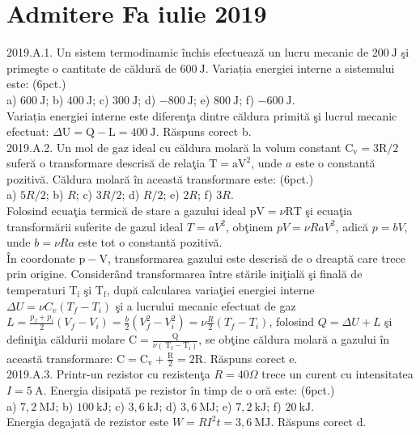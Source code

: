 
\section{Admitere Fa iulie 2019}

2019.A.1. Un sistem termodinamic închis efectuează un lucru mecanic de $200 \mathrm{~J}$ şi primeşte o cantitate de căldură de $600 \mathrm{~J}$. Variația energiei interne a sistemului este: (6pct.)\\ a) $600 \mathrm{~J}$; b) $400 \mathrm{~J}$; c) $300 \mathrm{~J}$; d) $-800 \mathrm{~J}$; e) $800 \mathrm{~J}$; f) $-600 \mathrm{~J}$.\\ Variația energiei interne este diferenţa dintre căldura primită şi lucrul mecanic efectuat: $\Delta \mathrm{U}=\mathrm{Q}-\mathrm{L}=400 \mathrm{~J}$. Răspuns corect b.\\

2019.A.2. Un mol de gaz ideal cu căldura molară la volum constant $\mathrm{C}_{\mathrm{v}}=3 \mathrm{R} / 2$ suferă o transformare descrisă de relaţia $\mathrm{T}=\mathrm{aV}^{2}$, unde $a$ este o constantă pozitivă. Căldura molară în această transformare este: (6pct.)\\ a) $5 R / 2$; b) $R$; c) $3 R / 2$; d) $R / 2$; e) $2 R$; f) $3 R$.\\ Folosind ecuaţia termică de stare a gazului ideal $\mathrm{pV}=\nu \mathrm{RT}$ şi ecuaţia transformării suferite de gazul ideal $T=a V^{2}$, obţinem $p V=\nu R a V^{2}$, adică $p=b V$, unde $b=\nu R a$ este tot o constantă pozitivă.\\ În coordonate $\mathrm{p}-\mathrm{V}$, transformarea gazului este descrisă de o dreaptă care trece prin origine. Considerând transformarea între stările iniţială şi finală de temperaturi $\mathrm{T}_{\mathrm{i}}$ şi $\mathrm{T}_{\mathrm{f}}$, după calcularea variaţiei energiei interne $\Delta U=\nu C_{v}\left(T_{f}-T_{i}\right)$ şi a lucrului mecanic efectuat de gaz $L=\frac{p_{f}+p_{i}}{2}\left(V_{f}-V_{i}\right)=\frac{b}{2}\left(V_{f}^{2}-V_{i}^{2}\right)=\nu \frac{R}{2}\left(T_{f}-T_{i}\right)$, folosind $Q=\Delta U+L$ şi definiţia căldurii molare $\mathrm{C}=\frac{\mathrm{Q}}{\nu\left(\mathrm{~T}_{\mathrm{f}}-\mathrm{T}_{\mathrm{i}}\right)}$, se obţine căldura molară a gazului în această transformare: $\mathrm{C}=\mathrm{C}_{\mathrm{v}}+\frac{\mathrm{R}}{2}=2 \mathrm{R}$. Răspuns corect e.\\

2019.A.3. Printr-un rezistor cu rezistenţa $R=40 \Omega$ trece un curent cu intensitatea $I=5 \mathrm{~A}$. Energia disipată pe rezistor în timp de o oră este: (6pct.)\\ a) $7,2 \mathrm{~MJ}$; b) $100 \mathrm{~kJ}$; c) $3,6 \mathrm{~kJ}$; d) $3,6 \mathrm{~MJ}$; e) $7,2 \mathrm{~kJ}$; f) $20 \mathrm{~kJ}$.\\ Energia degajată de rezistor este $W=R I^{2} t=3,6 \mathrm{~MJ}$. Răspuns corect d.\\

